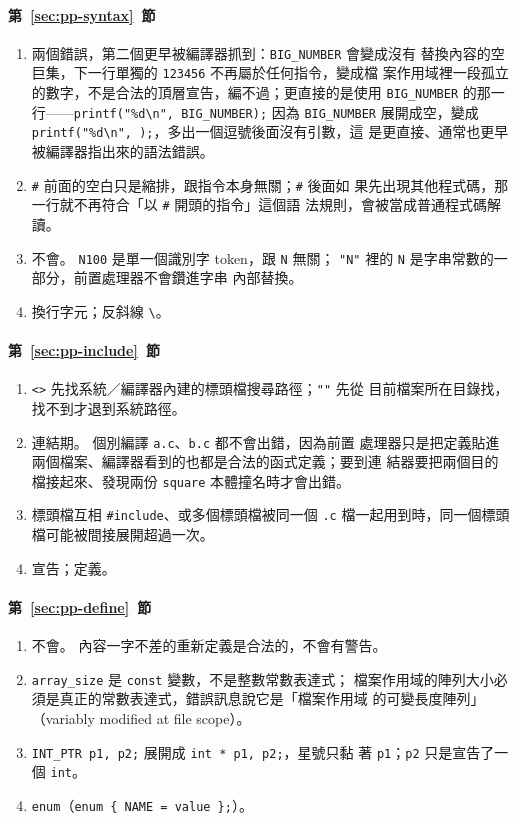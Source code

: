 \paragraph{第~\ref{sec:pp-syntax}~節}
\begin{enumerate}
\item 兩個錯誤，第二個更早被編譯器抓到：\texttt{BIG\_NUMBER} 會變成沒有
替換內容的空巨集，下一行單獨的 \texttt{123456} 不再屬於任何指令，變成檔
案作用域裡一段孤立的數字，不是合法的頂層宣告，編不過；更直接的是使用
\texttt{BIG\_NUMBER} 的那一行——\texttt{printf("\%d\textbackslash n",
BIG\_NUMBER);} 因為 \texttt{BIG\_NUMBER} 展開成空，變成
\texttt{printf("\%d\textbackslash n", );}，多出一個逗號後面沒有引數，這
是更直接、通常也更早被編譯器指出來的語法錯誤。
\item \texttt{\#} 前面的空白只是縮排，跟指令本身無關；\texttt{\#} 後面如
果先出現其他程式碼，那一行就不再符合「以 \texttt{\#} 開頭的指令」這個語
法規則，會被當成普通程式碼解讀。
\item 不會。 \texttt{N100} 是單一個識別字 token，跟 \texttt{N} 無關；
\texttt{"N"} 裡的 \texttt{N} 是字串常數的一部分，前置處理器不會鑽進字串
內部替換。
\item 換行字元；反斜線 \texttt{\textbackslash}。
\end{enumerate}

\paragraph{第~\ref{sec:pp-include}~節}
\begin{enumerate}
\item \texttt{<>} 先找系統／編譯器內建的標頭檔搜尋路徑；\texttt{""} 先從
目前檔案所在目錄找，找不到才退到系統路徑。
\item 連結期。 個別編譯 \texttt{a.c}、\texttt{b.c} 都不會出錯，因為前置
處理器只是把定義貼進兩個檔案、編譯器看到的也都是合法的函式定義；要到連
結器要把兩個目的檔接起來、發現兩份 \texttt{square} 本體撞名時才會出錯。
\item 標頭檔互相 \texttt{\#include}、或多個標頭檔被同一個 \texttt{.c}
檔一起用到時，同一個標頭檔可能被間接展開超過一次。
\item 宣告；定義。
\end{enumerate}

\paragraph{第~\ref{sec:pp-define}~節}
\begin{enumerate}
\item 不會。 內容一字不差的重新定義是合法的，不會有警告。
\item \texttt{array\_size} 是 \texttt{const} 變數，不是整數常數表達式；
檔案作用域的陣列大小必須是真正的常數表達式，錯誤訊息說它是「檔案作用域
的可變長度陣列」（variably modified at file scope）。
\item \texttt{INT\_PTR p1, p2;} 展開成 \texttt{int * p1, p2;}，星號只黏
著 \texttt{p1}；\texttt{p2} 只是宣告了一個 \texttt{int}。
\item \texttt{enum}（\texttt{enum \{ NAME = value \};}）。
\end{enumerate}


